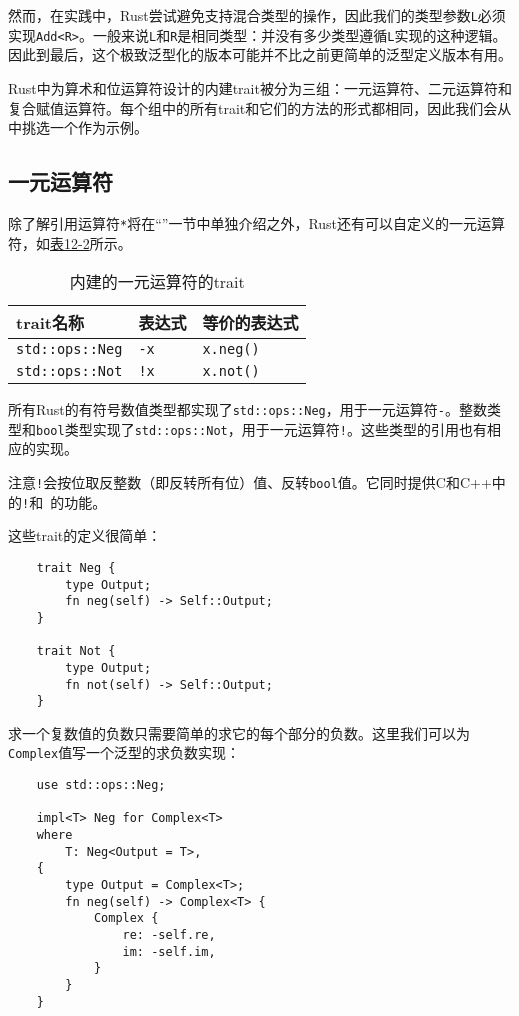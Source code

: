 然而，在实践中，Rust尝试避免支持混合类型的操作，因此我们的类型参数\texttt{L}必须实现\texttt{Add<R>}。一般来说\texttt{L}和\texttt{R}是相同类型：并没有多少类型遵循\texttt{L}实现的这种逻辑。因此到最后，这个极致泛型化的版本可能并不比之前更简单的泛型定义版本有用。

Rust中为算术和位运算符设计的内建trait被分为三组：一元运算符、二元运算符和复合赋值运算符。每个组中的所有trait和它们的方法的形式都相同，因此我们会从中挑选一个作为示例。

\subsection{一元运算符}\label{unop}
除了解引用运算符\texttt{*}将在“”一节中单独介绍之外，Rust还有可以自定义的一元运算符，如\hyperref[t12-2]{表12-2}所示。

\begin{table}[htbp]
    \centering
    \caption{内建的一元运算符的trait}
    \label{t12-2}
    \begin{tabular}{p{}p{}p{}}
        \hline
        \textbf{trait名称}  & \textbf{表达式}   & \textbf{等价的表达式} \\
        \hline
        \texttt{std::ops::Neg}  & \texttt{-x}   & \texttt{x.neg()}  \\
        \rowcolor{tablecolor}
        \texttt{std::ops::Not}  & \texttt{!x}   & \texttt{x.not()}  \\
    \end{tabular}
\end{table}

所有Rust的有符号数值类型都实现了\texttt{std::ops::Neg}，用于一元运算符\texttt{-}。整数类型和\texttt{bool}类型实现了\texttt{std::ops::Not}，用于一元运算符\texttt{!}。这些类型的引用也有相应的实现。

注意\texttt{!}会按位取反整数（即反转所有位）值、反转\texttt{bool}值。它同时提供C和C++中的\texttt{!}和\texttt{~}的功能。

这些trait的定义很简单：
\begin{verbatim}
    trait Neg {
        type Output;
        fn neg(self) -> Self::Output;
    }

    trait Not {
        type Output;
        fn not(self) -> Self::Output;
    }
\end{verbatim}

求一个复数值的负数只需要简单的求它的每个部分的负数。这里我们可以为\texttt{Complex}值写一个泛型的求负数实现：
\begin{verbatim}
    use std::ops::Neg;

    impl<T> Neg for Complex<T>
    where
        T: Neg<Output = T>,
    {
        type Output = Complex<T>;
        fn neg(self) -> Complex<T> {
            Complex {
                re: -self.re,
                im: -self.im,
            }
        }
    }
\end{verbatim}

